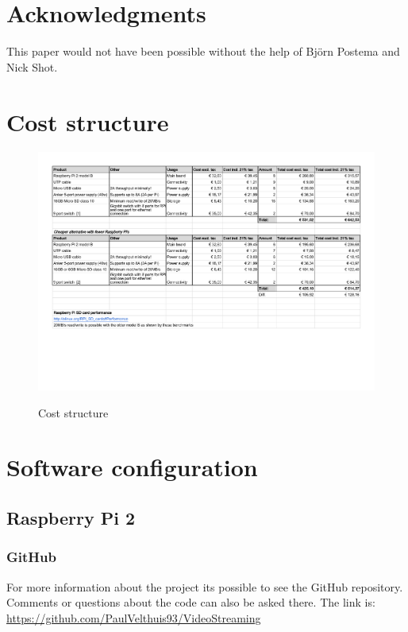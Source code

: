 \documentclass{sig-alternate-br}
\begin{document}
\section{Acknowledgments}
This paper would not have been possible without the help of Björn Postema and Nick Shot.
\clearpage

%
%
\vspace{50 mm}


\clearpage
\appendix

\section{Cost structure}\label{sec:cost}
\begin{figure}[H]
	\includegraphics[scale=0.65]{Kostenoverzicht_cluster.pdf}
	\label{fig:cost}
	\caption{Cost structure}
\end{figure}


\section{Software configuration}\label{sec:software}

\subsection{Raspberry Pi 2}

\subsubsection{GitHub}
For more information about the project its possible to see the GitHub repository. Comments or questions about the code can also be asked there. \newline
The link is: \newline
\url{https://github.com/PaulVelthuis93/VideoStreaming}
\end{document}
